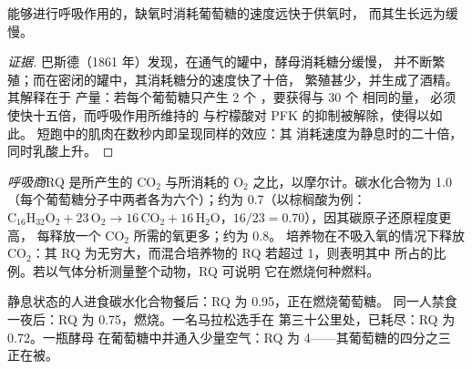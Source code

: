 \begin{proposition}[巴斯德效应]\label{prop:b1:respiration-fermentation:pasteur}
能够进行呼吸作用的，缺氧时消耗葡萄糖的速度远快于供氧时，
而其生长远为缓慢。
\end{proposition}
\begin{proof}[证据]
巴斯德（1861 年）发现，在通气的罐中，酵母消耗糖分缓慢，
并不断繁殖；而在密闭的罐中，其消耗糖分的速度快了十倍，
繁殖甚少，并生成了酒精。其解释在于 
产量：若每个葡萄糖只产生 2 个 ，要获得与 30 个  相同的量，
必须使快十五倍，而呼吸作用所维持的
 与柠檬酸对 PFK 的抑制被解除，使得以如此。
短跑中的肌肉在数秒内即呈现同样的效应：其
消耗速度为静息时的二十倍，同时乳酸上升。
\end{proof}

\begin{definition}[呼吸商]\label{def:b1:respiration-fermentation:rq}
\emph{呼吸商}RQ 是所产生的 $\mathrm{CO_2}$ 与所消耗的
$\mathrm{O_2}$ 之比，以摩尔计。碳水化合物为 1.0
（每个葡萄糖分子中两者各为六个）；约为 0.7（以棕榈酸为例：
$\mathrm{C_{16}H_{32}O_2} + 23\,\mathrm{O_2} \to 16\,\mathrm{CO_2} +
16\,\mathrm{H_2O}$，$16/23 = 0.70$），因其碳原子还原程度更高，
每释放一个 $\mathrm{CO_2}$ 所需的氧更多；约为 0.8。
培养物在不吸入氧的情况下释放 $\mathrm{CO_2}$：其
RQ 为无穷大，而混合培养物的 RQ 若超过 1，则表明其中
所占的比例。若以气体分析测量整个动物，RQ 可说明
它在燃烧何种燃料。
\end{definition}

\begin{example}[读取 RQ]\label{ex:b1:respiration-fermentation:readrq}
静息状态的人进食碳水化合物餐后：RQ 为 0.95，正在燃烧葡萄糖。
同一人禁食一夜后：RQ 为 0.75，燃烧。一名马拉松选手在
第三十公里处，已耗尽：RQ 为 0.72。一瓶酵母
在葡萄糖中并通入少量空气：RQ 为 4——其葡萄糖的四分之三
正在被。
\end{example}

